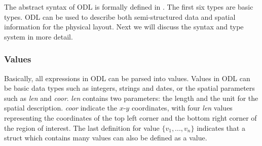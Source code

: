 
The abstract syntax of ODL is formally defined in .
The first six types are basic types. 
ODL can be used to describe both semi-structured data and 
spatial information for the physical layout. Next we 
will discuss the 
syntax and type system in more detail. 

\subsubsection{Values}



Basically, all expressions in ODL can be parsed into values. Values 
in ODL can be basic data types such as integers, strings and dates, 
or the spatial parameters such as {\em len} and {\em coor}. 
{\em len} contains two parameters: the  
length and the unit for the spatial description. {\em coor} 
indicate  the $x$-$y$ coordinates, with four {\em len} values representing 
the coordinates of the top left corner and the bottom right corner of 
the region of interest. The last definition for value  {\em $\{v_1, ..., v_n\}$} indicates that a struct which contains many values can also be defined as a value. 

